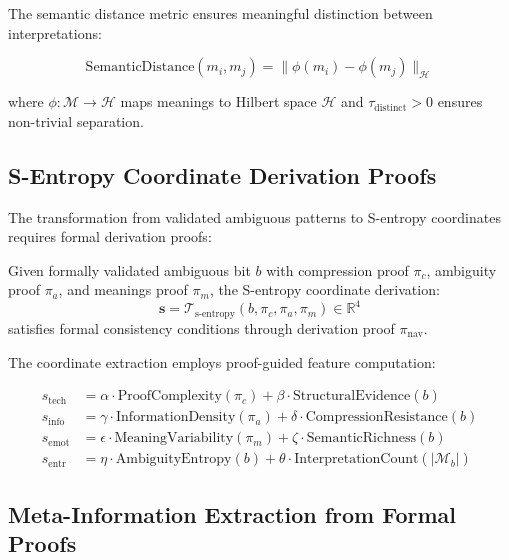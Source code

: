 The semantic distance metric ensures meaningful distinction between interpretations:

\begin{equation}
\text{SemanticDistance}(m_i, m_j) = \|\phi(m_i) - \phi(m_j)\|_{\mathcal{H}}
\label{eq:semantic-distance}
\end{equation}

where $\phi: \mathcal{M} \to \mathcal{H}$ maps meanings to Hilbert space $\mathcal{H}$ and $\tau_{\text{distinct}} > 0$ ensures non-trivial separation.

\subsection{S-Entropy Coordinate Derivation Proofs}

The transformation from validated ambiguous patterns to S-entropy coordinates requires formal derivation proofs:

\begin{theorem}
Given formally validated ambiguous bit $b$ with compression proof $\pi_c$, ambiguity proof $\pi_a$, and meanings proof $\pi_m$, the S-entropy coordinate derivation:
\begin{equation}
\mathbf{s} = \mathcal{T}_{\text{s-entropy}}(b, \pi_c, \pi_a, \pi_m) \in \mathbb{R}^4
\label{eq:s-entropy-derivation}
\end{equation}
satisfies formal consistency conditions through derivation proof $\pi_{\text{nav}}$.
\end{theorem}

The coordinate extraction employs proof-guided feature computation:

\begin{align}
s_{\text{tech}} &= \alpha \cdot \text{ProofComplexity}(\pi_c) + \beta \cdot \text{StructuralEvidence}(b) \label{eq:tech-coordinate}\\
s_{\text{info}} &= \gamma \cdot \text{InformationDensity}(\pi_a) + \delta \cdot \text{CompressionResistance}(b) \label{eq:info-coordinate}\\
s_{\text{emot}} &= \epsilon \cdot \text{MeaningVariability}(\pi_m) + \zeta \cdot \text{SemanticRichness}(b) \label{eq:emot-coordinate}\\
s_{\text{entr}} &= \eta \cdot \text{AmbiguityEntropy}(b) + \theta \cdot \text{InterpretationCount}(|\mathcal{M}_b|) \label{eq:entr-coordinate}
\end{align}

\subsection{Meta-Information Extraction from Formal Proofs}

